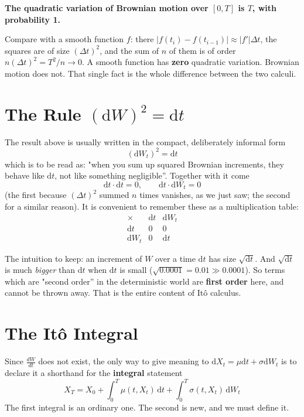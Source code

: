 \documentclass[]{article}
\newcommand{\Ito}{It\^{o}}
\newcommand{\dd}{\mathrm{d}}
\begin{document}
	\textbf{The quadratic variation of Brownian motion over $[0,T]$ is $T$, with probability 1.}

	Compare with a smooth function $f$: there $|f(t_i) - f(t_{i-1})| \approx |f'| \Delta t$, the squares are of size $(\Delta t)^2$, and the sum of $n$ of them is of order $n (\Delta t)^2 = T^2/n \to 0$.
	A smooth function has \textbf{zero} quadratic variation. Brownian motion does not. That single fact is the whole difference between the two calculi.

	\section{The Rule $(\dd W)^2 = \dd t$}

	The result above is usually written in the compact, deliberately informal form
	$$
	\boxed{\;(\dd W_t)^2 = \dd t\;}
	$$
	which is to be read as: "when you sum up squared Brownian increments, they behave like $\dd t$, not like something negligible''.
	Together with it come
	$$
	\dd t \cdot \dd t = 0, \qquad \dd t \cdot \dd W_t = 0
	$$
	(the first because $(\Delta t)^2$ summed $n$ times vanishes, as we just saw; the second for a similar reason).
	It is convenient to remember these as a multiplication table:
	$$
	\begin{array}{c|cc}
		\times & \dd t & \dd W_t \\
		\hline
		\dd t & 0 & 0 \\
		\dd W_t & 0 & \dd t
	\end{array}
	$$

	The intuition to keep: an increment of $W$ over a time $\dd t$ has size $\sqrt{\dd t}$.
	And $\sqrt{\dd t}$ is much \textit{bigger} than $\dd t$ when $\dd t$ is small ($\sqrt{0.0001} = 0.01 \gg 0.0001$).
	So terms which are "second order'' in the deterministic world are \textbf{first order} here, and cannot be thrown away.
	That is the entire content of \Ito{} calculus.

	\section{The \Ito{} Integral}

	Since $\frac{dW}{dt}$ does not exist, the only way to give meaning to $\dd X_t = \mu \dd t + \sigma \dd W_t$ is to declare it a shorthand for the \textbf{integral} statement
	$$
	X_T = X_0 + \int_0^T \mu(t, X_t) \, \dd t + \int_0^T \sigma(t, X_t) \, \dd W_t
	$$
	The first integral is an ordinary one. The second is new, and we must define it.
\end{document}
